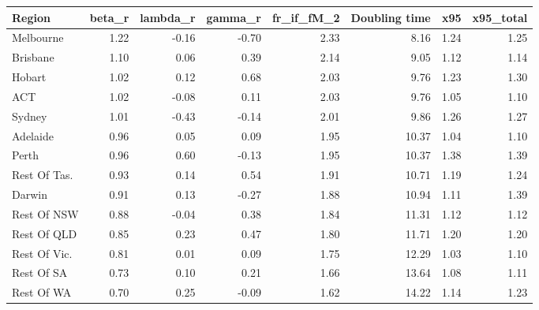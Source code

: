 \begin{tabular}{lrrrrrrr}
\toprule
Region & beta_r & lambda_r & gamma_r & fr_if_fM_2 & Doubling time & x95 & x95_total \\
\midrule
Melbourne & 1.22 & -0.16 & -0.70 & 2.33 & 8.16 & 1.24 & 1.25 \\
Brisbane & 1.10 & 0.06 & 0.39 & 2.14 & 9.05 & 1.12 & 1.14 \\
Hobart & 1.02 & 0.12 & 0.68 & 2.03 & 9.76 & 1.23 & 1.30 \\
ACT & 1.02 & -0.08 & 0.11 & 2.03 & 9.76 & 1.05 & 1.10 \\
Sydney & 1.01 & -0.43 & -0.14 & 2.01 & 9.86 & 1.26 & 1.27 \\
Adelaide & 0.96 & 0.05 & 0.09 & 1.95 & 10.37 & 1.04 & 1.10 \\
Perth & 0.96 & 0.60 & -0.13 & 1.95 & 10.37 & 1.38 & 1.39 \\
Rest Of Tas. & 0.93 & 0.14 & 0.54 & 1.91 & 10.71 & 1.19 & 1.24 \\
Darwin & 0.91 & 0.13 & -0.27 & 1.88 & 10.94 & 1.11 & 1.39 \\
Rest Of NSW & 0.88 & -0.04 & 0.38 & 1.84 & 11.31 & 1.12 & 1.12 \\
Rest Of QLD & 0.85 & 0.23 & 0.47 & 1.80 & 11.71 & 1.20 & 1.20 \\
Rest Of Vic. & 0.81 & 0.01 & 0.09 & 1.75 & 12.29 & 1.03 & 1.10 \\
Rest Of SA & 0.73 & 0.10 & 0.21 & 1.66 & 13.64 & 1.08 & 1.11 \\
Rest Of WA & 0.70 & 0.25 & -0.09 & 1.62 & 14.22 & 1.14 & 1.23 \\
\bottomrule
\end{tabular}
